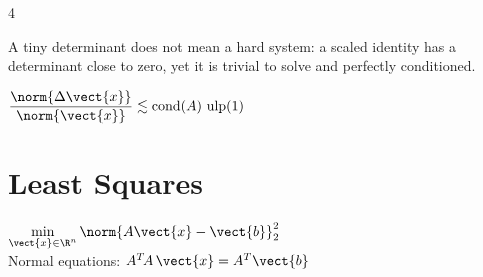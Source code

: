 \documentclass[8pt,a4paper,landscape]{extarticle}
\begin{document}
\begin{multicols*}{4}
\begin{warn}[title=Not the determinant]
A tiny determinant does not mean a hard system: a scaled identity has a
determinant close to zero, yet it is trivial to solve and perfectly conditioned.
\end{warn}

\begin{thm}[title=Implications (without proof{,} good solver{,} exact \(\vect{b}\)),halign=center,top=3pt,bottom=3pt]
\(\displaystyle \frac{\norm{\Delta\vect{x}}}{\norm{\vect{x}}} \lesssim
\operatorname{cond}(A)\,\operatorname{ulp}(1)\)\\[2pt]
\end{thm}

\section{Least Squares}

\begin{thm}[title=Problem (\(A\in\R^{m\times n}{,}\ m>n\)),halign=center,top=3pt,bottom=3pt]
\(\displaystyle \min_{\vect{x}\in\R^n} \norm{A\vect{x}-\vect{b}}_2^2\)\\[2pt]
Normal equations: \(A^T\!A\,\vect{x} = A^T\vect{b}\)
\end{thm}

\end{multicols*}
\end{document}
